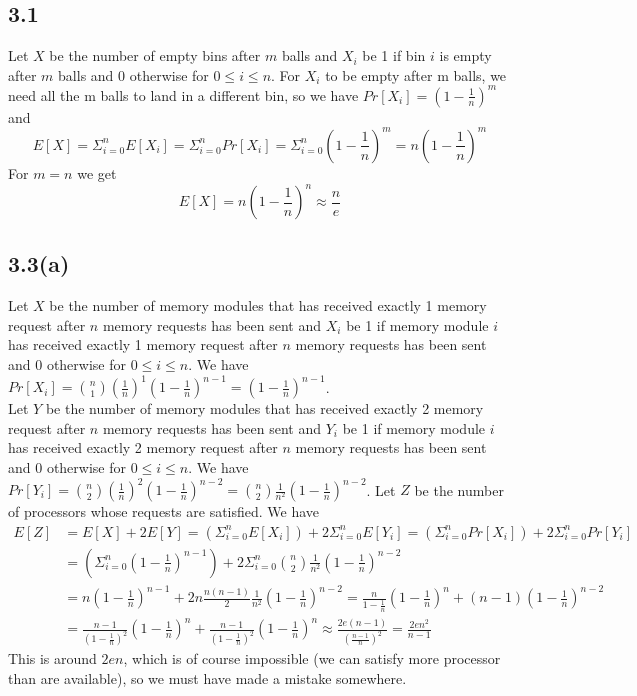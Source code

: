 \documentclass[12pt]{article}
\begin{document}
\subsection*{3.1}
Let $X$ be the number of empty bins after $m$ balls and $X_i$ be 1 if bin $i$ is empty after $m$ balls and 0 otherwise for $0\leq i\leq n$. For $X_i$ to be empty after m balls, we need all the m balls to land in a different bin, so we have $Pr[X_i]=\left(1-\frac{1}{n}\right)^m$ and $$E[X]=\Sigma_{i=0}^nE[X_i]=\Sigma_{i=0}^nPr[X_i]=\Sigma_{i=0}^n\left(1-\frac{1}{n}\right)^m=n\left(1-\frac{1}{n}\right)^m$$
For $m=n$ we get $$E[X]=n\left(1-\frac{1}{n}\right)^n\approx\frac{n}{e}$$

\subsection*{3.3(a)}
Let $X$ be the number of memory modules that has received exactly 1 memory request after $n$ memory requests has been sent and $X_i$ be 1 if memory module $i$ has received exactly 1 memory request after $n$ memory requests has been sent and 0 otherwise for $0\leq i\leq n$. We have $Pr[X_i]={n\choose 1}\left(\frac{1}{n}\right)^1\left(1-\frac{1}{n}\right)^{n-1}=\left(1-\frac{1}{n}\right)^{n-1}$.\\
Let $Y$ be the number of memory modules that has received exactly 2 memory request after $n$ memory requests has been sent and $Y_i$ be 1 if memory module $i$ has received exactly 2 memory request after $n$ memory requests has been sent and 0 otherwise for $0\leq i\leq n$. We have $Pr[Y_i]={n\choose 2}\left(\frac{1}{n}\right)^2\left(1-\frac{1}{n}\right)^{n-2}={n\choose 2}\frac{1}{n^2}\left(1-\frac{1}{n}\right)^{n-2}$.
Let $Z$ be the number of processors whose requests are satisfied. We have \begin{align*}E[Z]&=E[X]+2E[Y]=\left(\Sigma_{i=0}^nE[X_i]\right)+2\Sigma_{i=0}^nE[Y_i]=\left(\Sigma_{i=0}^nPr[X_i]\right)+2\Sigma_{i=0}^nPr[Y_i]\\&=\left(\Sigma_{i=0}^n\left(1-\frac{1}{n}\right)^{n-1}\right)+2\Sigma_{i=0}^n{n\choose 2}\frac{1}{n^2}\left(1-\frac{1}{n}\right)^{n-2}\\&=n\left(1-\frac{1}{n}\right)^{n-1}+2n\frac{n(n-1)}{2}\frac{1}{n^2}\left(1-\frac{1}{n}\right)^{n-2}=\frac{n}{1-\frac{1}{n}}\left(1-\frac{1}{n}\right)^n+(n-1)\left(1-\frac{1}{n}\right)^{n-2}\\&=\frac{n-1}{\left(1-\frac{1}{n}\right)^2}\left(1-\frac{1}{n}\right)^n+\frac{n-1}{\left(1-\frac{1}{n}\right)^2}\left(1-\frac{1}{n}\right)^n\approx\frac{2e(n-1)}{\left(\frac{n-1}{n}\right)^2}=\frac{2en^2}{n-1}\end{align*}
This is around $2en$, which is of course impossible (we can satisfy more processor than are available), so we must have made a mistake somewhere.
\end{document}
